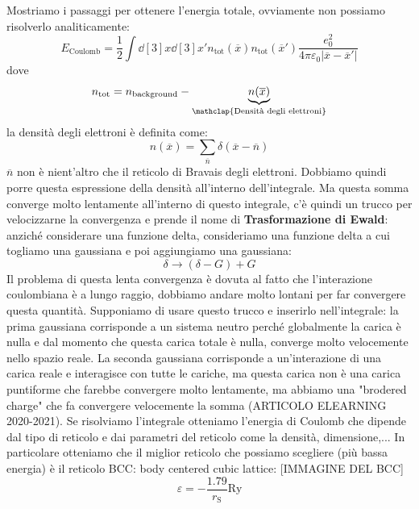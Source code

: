 Mostriamo i passaggi per ottenere l'energia totale, ovviamente non possiamo risolverlo analiticamente:
\begin{equation*}
    E_{\text{Coulomb}}=\frac 12 \int \dd[3]{x}\dd[3]{x'}n_{\text{tot}}(\overline x)n_{\text{tot}}(\overline{x}')\frac{e_0^2}{4\pi\varepsilon_0|\overline{x}-\overline{x}'|}
\end{equation*}
dove
\begin{equation*}
    n_{\text{tot}}=n_{\text{background}}-\underbrace{n(\overline x)}_{\mathclap{\text{Densità degli elettroni}}}
\end{equation*}
la densità degli elettroni è definita come:
\begin{equation*}
    n(\overline x)=\sum_{\overline n}\delta(\overline x-\overline n)
\end{equation*}
$\overline n$ non è nient'altro che il reticolo di Bravais degli elettroni. Dobbiamo quindi porre questa espressione della densità all'interno dell'integrale. Ma questa somma converge molto lentamente all'interno di questo integrale, c'è quindi un trucco per velocizzarne la convergenza e prende il nome di \textbf{Trasformazione di Ewald}: anziché considerare una funzione delta, consideriamo una funzione delta a cui togliamo una gaussiana e poi aggiungiamo una gaussiana:
\begin{equation*}
    \delta \rightarrow (\delta-G)+G
\end{equation*}
Il problema di questa lenta convergenza è dovuta al fatto che l'interazione coulombiana è a lungo raggio, dobbiamo andare molto lontani per far convergere questa quantità. Supponiamo di usare questo trucco e inserirlo nell'integrale: la prima gaussiana corrisponde a un sistema neutro perché globalmente la carica è nulla e dal momento che questa carica totale è nulla, converge molto velocemente nello spazio reale. La seconda gaussiana corrisponde a un'interazione di una carica reale e interagisce con tutte le cariche, ma questa carica non è una carica puntiforme che farebbe convergere molto lentamente, ma abbiamo una "brodered charge" che fa convergere velocemente la somma (ARTICOLO ELEARNING 2020-2021).
Se risolviamo l'integrale otteniamo l'energia di Coulomb che dipende dal tipo di reticolo e dai parametri del reticolo come la densità, dimensione,... In particolare otteniamo che il miglior reticolo che possiamo scegliere (più bassa energia) è il reticolo BCC: body centered cubic lattice:
[IMMAGINE DEL BCC]
\begin{equation*}
    \varepsilon=-\frac{1.79}{r_\text{S}}\text{Ry}
\end{equation*}
